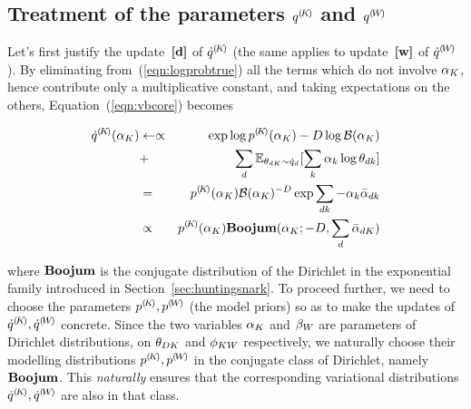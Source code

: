 \subsection{Treatment of the parameters ${q}^{(\!{K}\!)}$ and ${q}^{(\!{W}\!)}$}
Let's first justify the update~$\textbf{[d]}$ of ${\dot{q}}^{(\!{K}\!)}$ (the same applies to update~$\textbf{[w]}$ of ${\dot{q}}^{(\!{W}\!)}$). By eliminating from~(\ref{eqn:logprobtrue}) all the terms which do not involve $\alpha_K$, hence contribute only a multiplicative constant, and taking expectations on the others, Equation~(\ref{eqn:vbcore}) becomes
\begin{small}
\begin{eqnarray*}
\cpnt{\dot{q}}{K}(\vmK_K)
& \assignn\propto &
\exp\log\cpnt{p}{K}(\vmK_K)-D\log\mathcal{B}(\vmK_K)\\
& + & \sum_d\expectation_{\vmDK_{dK}\sim\dot{q}_d}[\sum_k\vmK_k\log\vmDK_{dk}]\\
& = &
\cpnt{p}{K}(\vmK_K)\mathcal{B}(\vmK_K)^{-D}\exp\sum_{dk}-\vmK_k\vvmbDK_{dk}\\
& \propto &
\cpnt{p}{K}(\vmK_K)\mbeta(\vmK_K;-D,\sum_d\vvmbDK_{dK})
\end{eqnarray*}
\end{small}
where $\mathbf{Boojum}$ is the conjugate distribution of the Dirichlet in the exponential family introduced in Section~\ref{sec:huntingsnark}. To proceed further, we need to choose the parameters ${p}^{(\!{K}\!)},{p}^{(\!{W}\!)}$ (the model priors) so as to make the updates of ${\dot{q}}^{(\!{K}\!)},{\dot{q}}^{(\!{W}\!)}$ concrete. Since the two variables $\alpha_K$ and $\beta_W$ are parameters of Dirichlet distributions, on $\theta_{DK}$ and $\phi_{KW}$ respectively, we naturally choose their modelling distributions ${p}^{(\!{K}\!)},{p}^{(\!{W}\!)}$ in the conjugate class of Dirichlet, namely $\mathbf{Boojum}$. This {\em naturally} ensures that the corresponding variational distributions ${\dot{q}}^{(\!{K}\!)},{\dot{q}}^{(\!{W}\!)}$ are also in that class.

